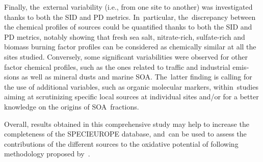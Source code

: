 \begin{otherlanguage}{english}
Finally, the~external variability (i.e., from one site to another) was investigated thanks
to both the SID and PD metrics.  In~particular, the~discrepancy between the chemical
profiles of sources could be quantified thanks to both the SID and PD metrics, notably
showing that fresh sea salt, nitrate-rich, sulfate-rich and biomass burning factor
profiles can be considered as chemically similar at all the sites studied. Conversely,
some significant variabilities were observed for other factor chemical profiles, such as
the ones related to traffic and industrial emissions as well as mineral dusts and marine
SOA. The~latter finding is calling for the use of additional variables, such as organic
molecular markers, within~studies aiming at scrutinizing specific local sources at
individual sites and/or for a better knowledge on the origins of SOA~fractions.

Overall, results obtained in this comprehensive study may help to increase the
completeness of the SPECIEUROPE database, and~can be used to assess the contributions of
the different sources to the oxidative potential of \PM{} following methodology proposed
by~\textcite{weberApportionment2018}.






\end{otherlanguage}
